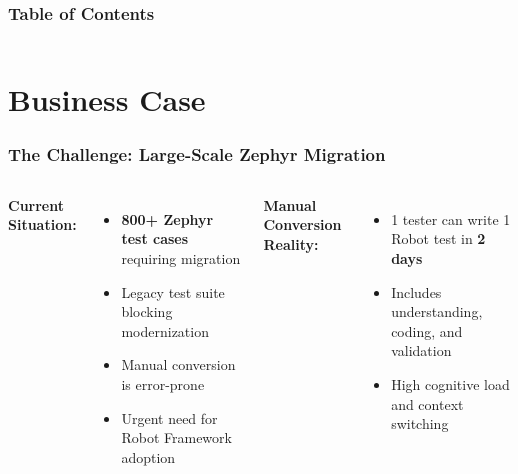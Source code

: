 
\frame{\titlepage}

\begin{frame}
\frametitle{Table of Contents}
\begin{columns}
{\large \tableofcontents[sections={1-6}]}

{\large \tableofcontents[sections={7-12}]}
\end{columns}
\end{frame}

\section{Business Case}
\begin{frame}
\frametitle{The Challenge: Large-Scale Zephyr Migration}
\begin{columns}
\textbf{Current Situation:}
\begin{itemize}
    \item \textbf{800+ Zephyr test cases} requiring migration
    \item Legacy test suite blocking modernization
    \item Manual conversion is error-prone
    \item Urgent need for Robot Framework adoption
\end{itemize}

\vspace{0.5cm}
\textbf{Manual Conversion Reality:}
\begin{itemize}
    \item 1 tester can write 1 Robot test in \textbf{2 days}
    \item Includes understanding, coding, and validation
    \item High cognitive load and context switching
\end{itemize}

\end{columns}
\end{frame}

